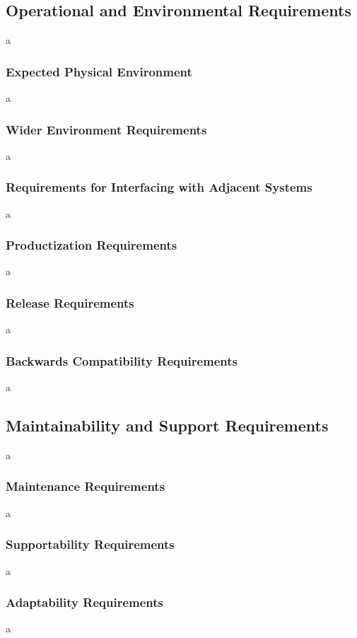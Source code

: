 \documentclass[12pt]{article}
\begin{document}
\subsection{Operational and Environmental Requirements}
a

\subsubsection{Expected Physical Environment}
a

\subsubsection{Wider Environment Requirements}
a

\subsubsection{Requirements for Interfacing with Adjacent Systems}
a

\subsubsection{Productization Requirements}
a

\subsubsection{Release Requirements}
a

\subsubsection{Backwards Compatibility Requirements}
a

\subsection{Maintainability and Support Requirements}
a

\subsubsection{Maintenance Requirements}
a

\subsubsection{Supportability Requirements}
a

\subsubsection{Adaptability Requirements}
a
\end{document}
